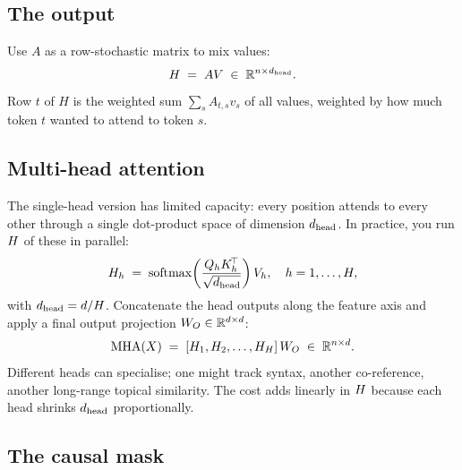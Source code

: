 \subsection{The output}

Use \(A\) as a row-stochastic matrix to mix values:
\begin{equation}
  H \;=\; A V \;\in\; \mathbb{R}^{n \times d_{\text{head}}}.
\end{equation}
Row \(t\) of \(H\) is the weighted sum \(\sum_s A_{t,s} v_s\) of all values,
weighted by how much token \(t\) wanted to attend to token \(s\).


\subsection{Multi-head attention}

The single-head version has limited capacity: every position attends to every
other through a single dot-product space of dimension \(d_{\text{head}}\). In
practice, you run \(H\) of these in parallel:
\begin{equation}
  H_h \;=\; \operatorname{softmax}\!\left( \frac{Q_h K_h^{\!\top}}{\sqrt{d_{\text{head}}}} \right) V_h,
  \quad h = 1, \ldots, H,
\end{equation}
with \(d_{\text{head}} = d / H\). Concatenate the head outputs along the
feature axis and apply a final output projection \(W_O \in \mathbb{R}^{d \times d}\):
\begin{equation}
  \text{MHA}(X) \;=\; [H_1, H_2, \ldots, H_H]\, W_O \;\in\; \mathbb{R}^{n \times d}.
\end{equation}
Different heads can specialise; one might track syntax, another co-reference,
another long-range topical similarity. The cost adds linearly in \(H\)
because each head shrinks \(d_{\text{head}}\) proportionally.

\subsection{The causal mask}

